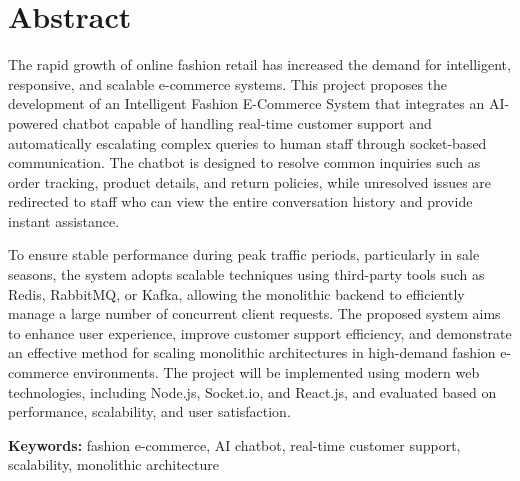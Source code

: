 \chapter*{Abstract}

The rapid growth of online fashion retail has increased the demand for intelligent, responsive, and scalable e-commerce systems. This project proposes the development of an Intelligent Fashion E-Commerce System that integrates an AI-powered chatbot capable of handling real-time customer support and automatically escalating complex queries to human staff through socket-based communication. The chatbot is designed to resolve common inquiries such as order tracking, product details, and return policies, while unresolved issues are redirected to staff who can view the entire conversation history and provide instant assistance.

To ensure stable performance during peak traffic periods, particularly in sale seasons, the system adopts scalable techniques using third-party tools such as Redis, RabbitMQ, or Kafka, allowing the monolithic backend to efficiently manage a large number of concurrent client requests. The proposed system aims to enhance user experience, improve customer support efficiency, and demonstrate an effective method for scaling monolithic architectures in high-demand fashion e-commerce environments. The project will be implemented using modern web technologies, including Node.js, Socket.io, and React.js, and evaluated based on performance, scalability, and user satisfaction.

\textbf{Keywords:} fashion e-commerce, AI chatbot, real-time customer support, scalability, monolithic architecture
